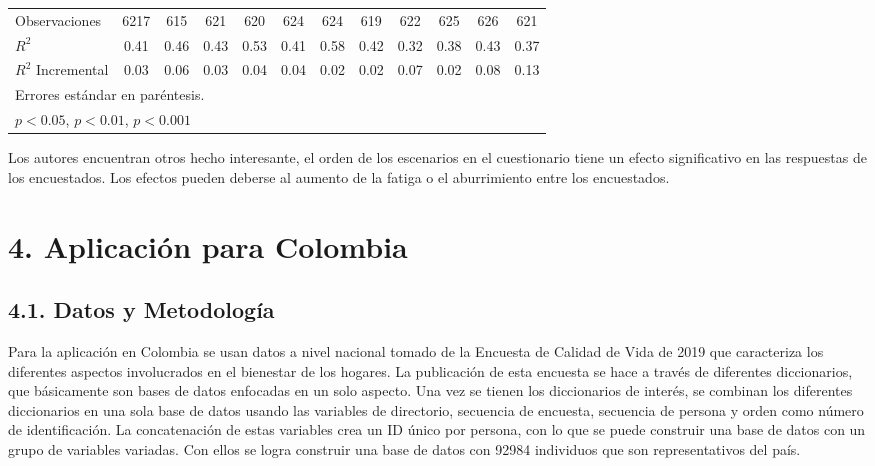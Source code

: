 \documentclass[12pt,spanish]{article}
\begin{document}
\begin{table}[H]
{{\begin{tabular}{l*{11}{c}}
        Observaciones    &     6217         &      615         &      621         &      620         &      624         &      624         &      619         &      622         &      625         &      626         &      621         \\
        
        \(R^{2}\)       &     0.41         &     0.46         &     0.43         &     0.53         &     0.41         &     0.58         &     0.42         &     0.32         &     0.38         &     0.43         &     0.37         \\
        
        $R^2$ Incremental   &     0.03         &     0.06         &     0.03         &     0.04         &     0.04         &     0.02         &     0.02         &     0.07         &     0.02         &     0.08         &     0.13         \\
        
        \hline\hline
        
        \multicolumn{12}{l}{\footnotesize Errores estándar en paréntesis.}\\
        \multicolumn{12}{l}{\footnotesize \sym{*} \(p<0.05\), \sym{**} \(p<0.01\), \sym{***} \(p<0.001\)}\\
        \end{tabular}
        }
        }
    \label{tab:tab2b}
\end{table}

Los autores encuentran otros hecho interesante, el orden de los escenarios en el cuestionario tiene un efecto significativo en las respuestas de los encuestados. Los efectos pueden deberse al aumento de la fatiga o el aburrimiento entre los encuestados. 


\section*{4. Aplicación para Colombia}
\subsection*{4.1. Datos y Metodología}
Para la aplicación en Colombia se usan datos a nivel nacional tomado de la Encuesta de Calidad de Vida de 2019 que caracteriza los diferentes aspectos involucrados en el bienestar de los hogares. La publicación de esta encuesta se hace a través de diferentes diccionarios, que básicamente  son bases de datos enfocadas en un solo aspecto. Una vez se tienen los diccionarios de interés, se combinan los diferentes diccionarios en una sola base de datos usando las variables de directorio, secuencia de encuesta, secuencia de persona y orden como número de identificación. La concatenación de estas variables crea un ID único por persona, con lo que se puede construir una base de datos con un grupo de variables variadas. Con ellos se logra construir una base de datos con 92984 individuos que son representativos del país.
\end{document}
